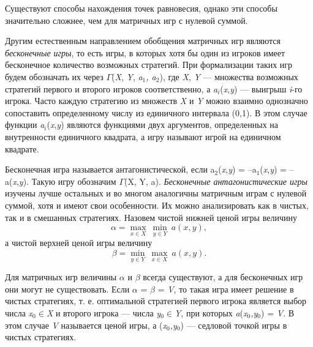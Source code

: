 
Существуют способы нахождения точек равновесия, однако эти способы значительно сложнее, чем для матричных игр с нулевой суммой.


Другим естественным направлением обобщения матричных игр являются \textit{бесконечные игры}, то есть игры, в которых хотя бы один из игроков имеет бесконечное количество возможных стратегий. При формализации таких игр будем обозначать их через $\Gamma$(\textit{X}, \textit{Y}, \emph{a$_{1}$, a$_{2}$}), где \textit{X}, \textit{Y} — множества возможных стратегий первого и второго игроков соответственно, а \emph{a$_{i}$}(\textit{x},\textit{y}) — выигрыш \textit{i}-го игрока. Часто каждую стратегию из множеств  \textit{X}  и \textit{Y} можно взаимно однозначно сопоставить определенному числу из единичного интервала (0,1). В этом случае функции \emph{a$_{i}$}(\textit{x},\textit{y}) являются функциями двух аргументов, определенных на внутренности единичного квадрата, а игру называют игрой на единичном квадрате.

Бесконечная игра называется антагонистической, если a$_{2}$(\textit{x},\textit{y}) = –a$_{1}$(\textit{x},\textit{y}) = –a(\textit{x},\textit{y}). Такую игру обозначим $\Gamma$(X, Y, a). \textit{Бесконечные антагонистические игры} изучены лучше остальных и во многом аналогичны матричным играм с нулевой суммой, хотя и имеют свои особенности. Их можно анализировать как в чистых, так и в смешанных стратегиях. Назовем чистой нижней ценой игры величину
\begin{equation}
\label{equation_4_47}
   \alpha = \max_{x \in X} \:\min_{y \in Y}\:a(x,y),
\end{equation}
а чистой верхней ценой игры величину
\begin{equation}
\label{equation_4_48}
   \beta =  \min_{y \in Y}\:\max_{x \in X}\:a(x,y).
\end{equation}

Для матричных игр величины $\alpha$ и $\beta$ всегда существуют, а для бесконечных  игр они могут не существовать. Если $\alpha$ = $\beta$ = \textit{V}, то такая игра имеет решение в чистых стратегиях, т. е. оптимальной стратегией первого игрока   является   выбор   числа   \emph{x$_{0}$}$\in$\textit{X}   и второго  игрока — числа \emph{y$_{0}$}$\in$\textit{Y}, при которых \textit{a}(\emph{x$_{0}$,y$_{0}$}) = \textit{V}. В этом случае \textit{V} называется ценой игры, а (\emph{x$_{0}$,y$_{0}$}) — седловой точкой игры в чистых стратегиях.

